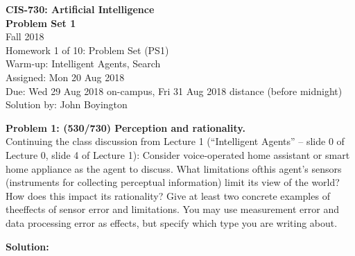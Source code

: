 \documentclass{amsart}
\theoremstyle{definition}
\begin{document}
\noindent
\LARGE{\textbf{CIS-730: Artificial Intelligence}} \\
\large
\noindent
\textbf{Problem Set 1} \\
Fall 2018 \\
Homework 1 of 10: Problem Set (PS1) \\
Warm-up: Intelligent Agents, Search \\
Assigned: Mon 20 Aug 2018 \\
Due: Wed 29 Aug 2018 on-campus, Fri 31 Aug 2018 distance (before midnight) \\
Solution by:  John Boyington \\
\newline
\bigskip



\textbf{Problem 1: (530/730) Perception and rationality.} \\
Continuing the class discussion from Lecture 1 (“Intelligent Agents” – slide 0 of Lecture 0, slide 4 of Lecture 1):
Consider voice-operated home assistant or smart home appliance as the agent to discuss.
What limitations ofthis agent’s sensors (instruments for collecting perceptual information) limit its view of the world?
How does this impact its rationality? Give at least two concrete examples of theeffects of sensor error and limitations.
You may use measurement error and data processing error as effects, but specify which type you are writing about.
\bigbreak

\textbf{Solution:}

\newpage

\end{document}
